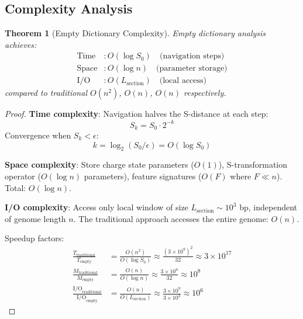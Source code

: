 \documentclass[11pt,a4paper]{article}
\newtheorem{theorem}{Theorem}[section]
\theoremstyle{remark}
\begin{document}
\subsection{Complexity Analysis}

\begin{theorem}[Empty Dictionary Complexity]
\label{thm:empty_dictionary_complexity}
Empty dictionary analysis achieves:
\begin{align}
\text{Time} &: O(\log S_0) \quad \text{(navigation steps)} \\
\text{Space} &: O(\log n) \quad \text{(parameter storage)} \\
\text{I/O} &: O(L_{\text{section}}) \quad \text{(local access)}
\end{align}
compared to traditional $O(n^2)$, $O(n)$, $O(n)$ respectively.
\end{theorem}

\begin{proof}
\textbf{Time complexity}: Navigation halves the S-distance at each step:
\begin{equation}
S_k = S_0 \cdot 2^{-k}
\end{equation}
Convergence when $S_k < \epsilon$:
\begin{equation}
k = \log_2(S_0/\epsilon) = O(\log S_0)
\end{equation}

\textbf{Space complexity}: Store charge state parameters ($O(1)$), S-transformation operator ($O(\log n)$ parameters), feature signatures ($O(F)$ where $F \ll n$). Total: $O(\log n)$.

\textbf{I/O complexity}: Access only local window of size $L_{\text{section}} \sim 10^3$ bp, independent of genome length $n$. The traditional approach accesses the entire genome: $O(n)$.

Speedup factors:
\begin{align}
\frac{T_{\text{traditional}}}{T_{\text{empty}}} &= \frac{O(n^2)}{O(\log S_0)} \approx \frac{(3 \times 10^9)^2}{32} \approx 3 \times 10^{17} \\
\frac{M_{\text{traditional}}}{M_{\text{empty}}} &= \frac{O(n)}{O(\log n)} \approx \frac{3 \times 10^9}{32} \approx 10^8 \\
\frac{\text{I/O}_{\text{traditional}}}{\text{I/O}_{\text{empty}}} &= \frac{O(n)}{O(L_{\text{section}})} \approx \frac{3 \times 10^9}{3 \times 10^3} \approx 10^6
\end{align}
\end{proof}
\end{document}
